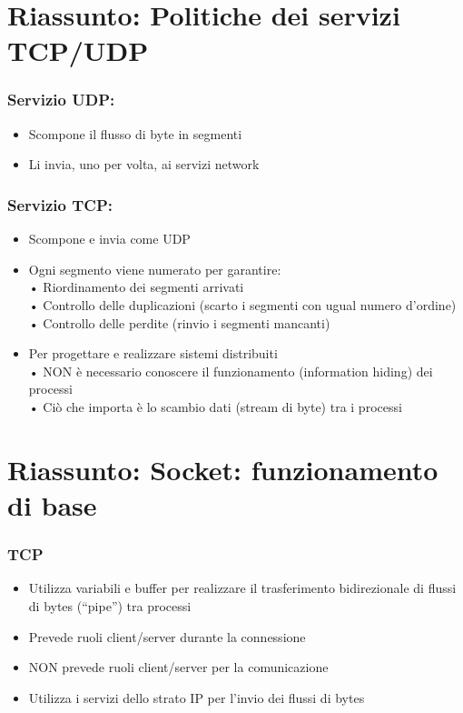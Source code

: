 \section{Riassunto: Politiche dei servizi TCP/UDP}
\subsubsection{Servizio UDP:}
\begin{itemize}
    \item Scompone il flusso di byte in segmenti
    \item Li invia, uno per volta, ai servizi network
\end{itemize}
\subsubsection{Servizio TCP:}
\begin{itemize}
    \item Scompone e invia come UDP
    \item Ogni segmento viene numerato per garantire:
    \\• Riordinamento dei segmenti arrivati
    \\• Controllo delle duplicazioni (scarto i segmenti con ugual numero d'ordine)
    \\• Controllo delle perdite (rinvio i segmenti mancanti)
    \item Per progettare e realizzare sistemi distribuiti
    \\• NON è necessario conoscere il funzionamento (information hiding) dei processi
    \\• Ciò che importa è lo scambio dati (stream di byte) tra i processi
\end{itemize}

\section{Riassunto: Socket: funzionamento di base}
\subsubsection{TCP}
\begin{itemize}
    \item Utilizza variabili e buffer per realizzare il trasferimento bidirezionale di flussi di bytes (“pipe”) tra processi
    \item Prevede ruoli client/server durante la connessione
    \item NON prevede ruoli client/server per la comunicazione
    \item Utilizza i servizi dello strato IP per l'invio dei flussi di bytes
\end{itemize}
